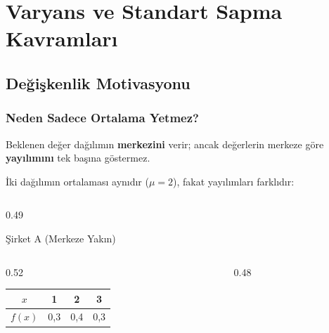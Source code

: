 \documentclass[light]{lutbeamer}
\begin{document}
\section{Varyans ve Standart Sapma Kavramları}
\subsection{Değişkenlik Motivasyonu}

\begin{frame}[fragile]
  \frametitle{Neden Sadece Ortalama Yetmez?}
  \small
  Beklenen değer dağılımın \textbf{merkezini} verir; ancak değerlerin merkeze göre \textbf{yayılımını} tek başına göstermez.

  \smallskip
  İki dağılımın ortalaması aynıdır ($\mu = 2$), fakat yayılımları farklıdır:

  \begin{columns}[T,onlytextwidth]
    \begin{column}{0.49\textwidth}
      \begin{exampleblock}{Şirket A (Merkeze Yakın)}
        \footnotesize
        \begin{columns}[T,totalwidth=\linewidth]
          \begin{column}{0.52\linewidth}
            \centering
            \setlength{\tabcolsep}{3pt}
            \renewcommand{\arraystretch}{1.05}
            \begin{tabular}{cccc}
              \toprule
              $x$ & 1 & 2 & 3 \\
              \midrule
              $f(x)$ & 0{,}3 & 0{,}4 & 0{,}3 \\
              \bottomrule
            \end{tabular}
          \end{column}
          \begin{column}{0.48\linewidth}
            \centering
\end{column}
\end{columns}
\end{exampleblock}
\end{column}
\end{columns}
\end{frame}
\end{document}
